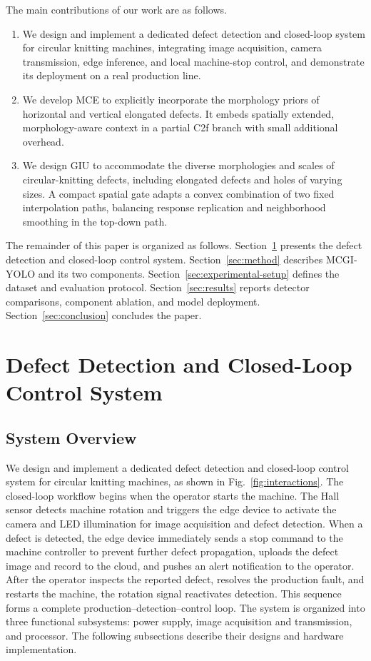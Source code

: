 \documentclass[journal]{IEEEtranTIE}
\begin{document}
The main contributions of our work are as follows.
\begin{enumerate}
  \renewcommand{\labelenumi}{\arabic{enumi})}
  \item We design and implement a dedicated defect detection and closed-loop system for circular knitting machines, integrating image acquisition, camera transmission, edge inference, and local machine-stop control, and demonstrate its deployment on a real production line.
  \item We develop MCE to explicitly incorporate the morphology priors of horizontal and vertical elongated defects. It embeds spatially extended, morphology-aware context in a partial C2f branch with small additional overhead.
  \item We design GIU to accommodate the diverse morphologies and scales of circular-knitting defects, including elongated defects and holes of varying sizes. A compact spatial gate adapts a convex combination of two fixed interpolation paths, balancing response replication and neighborhood smoothing in the top-down path.
\end{enumerate}

The remainder of this paper is organized as follows. Section~\ref{sec:system-design} presents the defect detection and closed-loop control system. Section~\ref{sec:method} describes MCGI-YOLO and its two components. Section~\ref{sec:experimental-setup} defines the dataset and evaluation protocol. Section~\ref{sec:results} reports detector comparisons, component ablation, and model deployment. Section~\ref{sec:conclusion} concludes the paper.

\section{Defect Detection and Closed-Loop Control System}
\label{sec:system-design}
\subsection{System Overview}
\label{sec:system-overview}
We design and implement a dedicated defect detection and closed-loop control system for circular knitting machines, as shown in Fig.~\ref{fig:interactions}. The closed-loop workflow begins when the operator starts the machine. The Hall sensor detects machine rotation and triggers the edge device to activate the camera and LED illumination for image acquisition and defect detection. When a defect is detected, the edge device immediately sends a stop command to the machine controller to prevent further defect propagation, uploads the defect image and record to the cloud, and pushes an alert notification to the operator. After the operator inspects the reported defect, resolves the production fault, and restarts the machine, the rotation signal reactivates detection. This sequence forms a complete production–detection–control loop. The system is organized into three functional subsystems: power supply, image acquisition and transmission, and processor. The following subsections describe their designs and hardware implementation.
\end{document}
